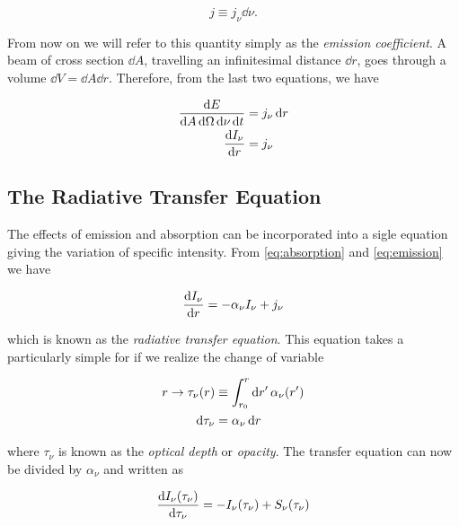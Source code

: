 \begin{equation}
        j \equiv j_\nu \dd{\nu}.
\end{equation}

From now on we will refer to this quantity simply as the \emph{emission
coefficient}.
A beam of cross section $\dd{A}$, travelling an infinitesimal distance
$\dd{r}$, goes through a volume $\dd{V} = \dd{A} \dd{r}$. Therefore, from
the last two equations, we have

\begin{equation}
        \begin{split}
        \frac{\dd{E}}{\dd{A}\dd{\Omega}\dd{\nu}\dd{t}} & = j_\nu \dd{r} \\
        \dv{I_\nu}{r} & = j_\nu
        \label{eq:emission}
        \end{split}
\end{equation}

\subsection{The Radiative Transfer Equation}\label{ss:radiative_transfer_eq}

The effects of emission and absorption can be incorporated into a sigle
equation giving the variation of specific intensity. From \autoref{eq:absorption}
and \autoref{eq:emission} we have

\begin{equation}
        \dv{I_\nu}{r} = -\alpha_\nu I_\nu + j_\nu
\end{equation}

which is known as the \emph{radiative transfer equation}. This equation
takes a particularly simple for if we realize the change of variable

\begin{equation}
        \begin{split}
                r \rightarrow \tau_\nu\qty(r) & \equiv \int^r_{r_0}
                \dd{r'}\alpha_\nu\qty(r') \\
                \dd{\tau_\nu} & = \alpha_\nu \dd{r}
        \end{split}
\end{equation}

where $\tau_\nu$ is known as the \emph{optical depth} or \emph{opacity}.
The transfer equation can now be divided by $\alpha_\nu$ and written as

\begin{equation}
        \dv{I_\nu\qty(\tau_\nu)}{\tau_\nu} = -I_\nu(\tau_\nu) +
        S_\nu\qty(\tau_\nu)
        \label{eq:radiative_transfer}
\end{equation}

